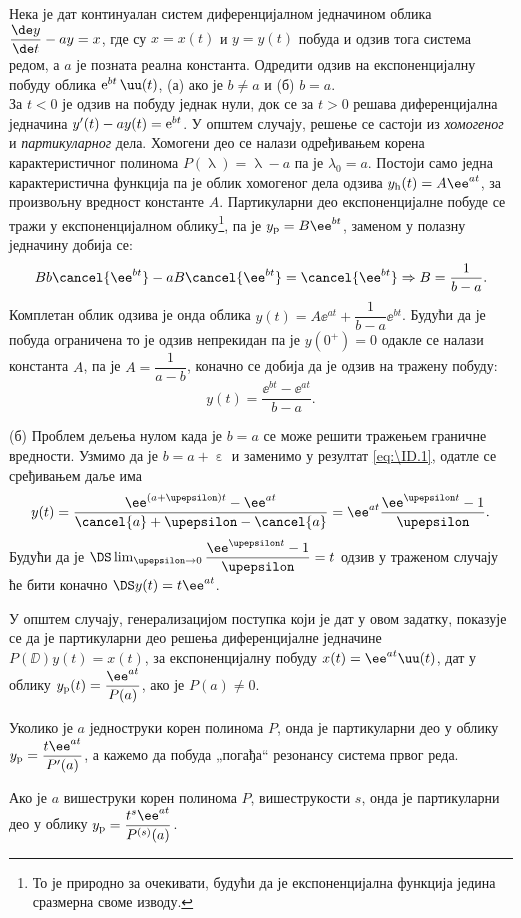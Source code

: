 \PID Нека је дат континуалан систем диференцијалном једначином облика 
${\dfrac{\de y}{\de t} - ay = x}$, где су $x=x(t)$ и $y=y(t)$ побуда и одзив тога система редом, а $a$ је позната
реална константа. Одредити одзив на експоненцијалну побуду облика 
${\rm e}^{bt} \, \uu(t)$, (а) ако је $b \neq a$ и (б) $b = a$. \\[5mm]

\RESENJE  За $t < 0$ је одзив на побуду једнак нули, док се 
за $t > 0$ решава диференцијална једначина 
${y'(t) - ay(t)  = {\rm e}^{bt}}$. У општем случају, решење се састоји из 
\textit{хомогеног} и \textit{партикуларног} дела. Хомогени део се налази одређивањем корена 
карактеристичног полинома $P(\uplambda) = \uplambda - a$ па је $\lambda_0 = a$. Постоји само 
једна карактеристична функција па је облик хомогеног дела одзива 
$y_{\rm h}(t) = A \ee^{at}$, за произвољну вредност константе $A$. Партикуларни део експоненцијалне побуде се тражи у 
експоненцијалном облику\footnote{То је природно за очекивати, будући да је експоненцијална функција
једина сразмерна своме изводу.}, па је $y_{\rm p} = B\ee^{bt}$, заменом у полазну једначину добија се:
\begin{equation}
    Bb\cancel{\ee^{bt}} - aB\cancel{\ee^{bt}} = \cancel{\ee^{bt}} \Rightarrow
    B = \dfrac{1}{b - a}.
\end{equation}
Комплетан облик одзива је онда облика $y(t) = A\ee^{at} + \dfrac{1}{b-a} \ee^{bt}$. Будући да је
побуда ограничена то је одзив непрекидан па је $y(0^+) = 0$ одакле се налази константа $A$, 
па је $A = \dfrac{1}{a - b}$, коначно се добија да је одзив на тражену побуду:
\begin{equation}
    y(t) = \dfrac{\ee^{bt} - \ee^{at}}{b - a}.
    \label{eq:\ID.1}
\end{equation}

(б) 
Проблем дељења нулом када је $b=a$ се може решити тражењем граничне вредности. 
Узмимо да је $b = a + \upepsilon$ 
и заменимо у резултат \ref{eq:\ID.1}, одатле се сређивањем даље има
\begin{equation}
    y(t) = \dfrac{\ee^{(a + \upepsilon)t} - \ee^{at}}{\cancel{a} + \upepsilon - \cancel{a}} = 
    \ee^{at} \dfrac{\ee^{\upepsilon t} - 1}{\upepsilon}.
\end{equation}
Будући да је $\DS \lim_{\upepsilon\to 0} \dfrac{\ee^{\upepsilon t} - 1}{\upepsilon} = t$ одзив
у траженом случају ће бити коначно 
$\DS y(t) = t \ee^{at}$.

У општем случају, генерализацијом поступка који је дат у овом задатку, показује 
се да је партикуларни део решења диференцијалне једначине 
$P(\DD) y(t) = x(t)$, за експоненцијалну побуду $x(t) = \ee^{at} \uu(t)$, дат 
у облику $y_{\rm p}(t) = \dfrac{\ee^{at}}{P(a)}$, ако је $P(a) \neq 0$.

Уколико је $a$ једноструки корен полинома $P$, онда је партикуларни део у облику
$y_{\rm p} = \dfrac{t \ee^{at}}{P'(a)}$, а кажемо да побуда „погађа“ резонансу система 
првог реда. 

Ако је $a$ вишеструки корен полинома $P$, вишеструкости $s$, 
онда је партикуларни део у облику $ y_{\rm p} = \dfrac{t^s \ee^{at}}{P^{(s)}(a)}$.

